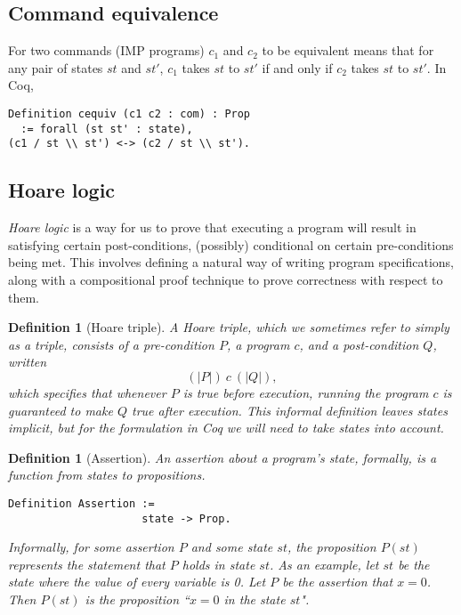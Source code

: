 \documentclass[compsoc,conference,a4paper,10pt,times]{IEEEtran}
\newtheorem{defin}[theorem]{Definition}
\begin{document}
\subsection{Command equivalence}\label{commequiv} 
    For two commands (IMP programs) $c_1$ and $c_2$ to be equivalent means that for any pair of states $st$ and $st'$, $c_1$ takes $st$ to $st'$ if and only if $c_2$ takes $st$ to $st'$.  In Coq,
\begin{verbatim}
Definition cequiv (c1 c2 : com) : Prop 
  := forall (st st' : state), 
(c1 / st \\ st') <-> (c2 / st \\ st').
\end{verbatim}


\subsection{Hoare logic}
\emph{Hoare logic} is a way for us to prove that executing a program will result in satisfying certain post-conditions, (possibly) conditional on certain pre-conditions being met.  This involves defining a natural way of writing program specifications, along with a compositional proof technique to prove correctness with respect to them.
\begin{defin}[Hoare triple]
	A \emph{Hoare triple}, which we sometimes refer to simply as a triple, consists of a pre-condition $P$, a program $c$, and a post-condition $Q$, written
    \[
    	(| P |)\ c\ (| Q |),
    \]
    which specifies that whenever $P$ is true before execution, running the program $c$ is guaranteed to make $Q$ true after execution.  This informal definition leaves states implicit, but for the formulation in Coq we will need to take states into account.
\end{defin}

\begin{defin}[Assertion]
An \emph{assertion} about a program's state, formally, is a function from states to propositions.
\begin{verbatim}   
Definition Assertion := 
                     state -> Prop.
\end{verbatim}
\par Informally, for some assertion $P$ and some state $st$, the proposition $P(st)$ represents the statement that $P$ holds in state $st$.  
As an example, let $st$ be the state where the value of every variable is 0.  Let $P$ be the assertion that $x=0$.  Then $P(st)$ is the proposition ``$x = 0$ in the state $st$".
\end{defin}
\end{document}
